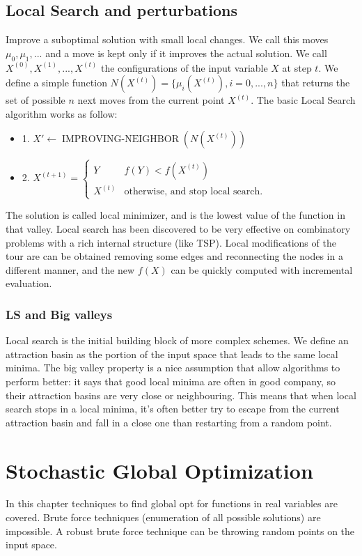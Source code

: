 \documentclass[11pt]{article}
\DeclareMathOperator{\improving}{IMPROVING-NEIGHBOR}
\begin{document}
\subsection{Local Search and perturbations}
Improve a suboptimal solution with small local changes. We call this moves $\mu_{0}, \mu_{1}, ...$ and a move is kept only if it improves the actual solution. We call $X^{(0)}, X^{(1)}, ... , X^{(t)}$ the configurations of the input variable $X$ at step $t$. We define a simple function $N(X^{(t)}) = \{\mu_{i}(X^{(t)}), i = 0, ... ,n\}$ that returns the set of possible $n$ next moves from the current point $X^{(t)}$. The basic Local Search algorithm works as follow:
\begin{itemize}
\item{1. $X' \leftarrow \improving(N(X^{(t)}))$}
\item{2. $X^{(t+1)} = \begin{cases} 
      Y & f(Y) < f(X^{(t)}) \\
      X^{(t)} & \text{otherwise, and stop local search}.
   \end{cases}
$}
\end{itemize}
The solution is called local minimizer, and is the lowest value of the function in that valley. Local search has been discovered to be very effective on combinatory problems with a rich internal structure (like TSP). Local modifications of the tour are can be obtained removing some edges and reconnecting the nodes in a different manner, and the new $f(X)$ can be quickly computed with incremental evaluation.

\subsubsection{LS and Big valleys}
Local search is the initial building block of more complex schemes. We define an attraction basin as the portion of the input space that leads to the same local minima. The big valley property is a nice assumption that allow algorithms to perform better: it says that good local minima are often in good company, so their attraction basins are very close or neighbouring. This means that when local search stops in a local minima, it's often better try to escape from the current attraction basin and fall in a close one than restarting from a random point.




\section{Stochastic Global Optimization}
In this chapter techniques to find global opt for functions in real variables are covered. Brute force techniques (enumeration of all possible solutions) are impossible. 
A robust brute force technique can be throwing random points on the input space.
\end{document}
